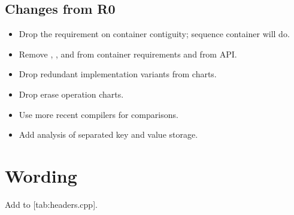 \subsection{Changes from R0}

\begin{itemize}
  \item Drop the requirement on container contiguity; sequence container will
    do.
  \item Remove , , and 
    from container requirements and from  API.
  \item Drop redundant implementation variants from charts.
  \item Drop erase operation charts.
  \item Use more recent compilers for comparisons.
  \item Add analysis of separated key and value storage.
\end{itemize}

\section{Wording}

Add  to [tab:headers.cpp].
